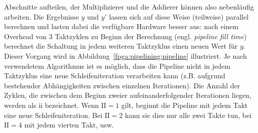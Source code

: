 Abschnitte aufteilen, der Multiplizierer und die Addierer können also
nebenläufig arbeiten. Die Ergebnisse $y$ und $y'$ lassen sich auf diese Weise
(teilweise) parallel berechnen und lasten dabei die verfügbare Hardware besser
aus: nach einem Overhead von 3 Taktzyklen zu Beginn der Berechnung (engl.
\textit{pipeline fill time}) berechnet die Schaltung in jedem weiteren
Taktzyklus einen neuen Wert für $y$. Dieser Vorgang wird in
Abbildung~\ref{fpga:pipelining:pipeline} illustriert. Je nach verwendetem
Algorithmus ist es möglich, dass die Pipeline nicht in jedem Taktzyklus eine
neue Schleifeniteration verarbeiten kann (z.B. aufgrund bestehender
Abhängigkeiten zwischen einzelnen Iterationen). Die Anzahl der Zyklen, die
zwischen dem Beginn zweier aufeinanderfolgender Iterationen liegen, werden als
\gls{ii} bezeichnet. Wenn $\text{II} = 1$ gilt, beginnt die Pipeline mit
jedem Takt eine neue Schleifeniteration. Bei $\text{II} = 2$ kann sie dies nur
alle zwei Takte tun, bei $\text{II} = 4$ mit jedem vierten Takt, usw.
\cite[vgl.][20--21]{hlsintro2019}

